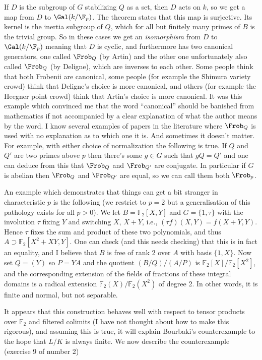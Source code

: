 If $D$ is the subgroup of $G$ stabilizing $Q$ as a set, then $D$ acts on $k$, so we get
a map from $D$ to $\Gal(k/\F_p)$. The theorem states that this map is surjective.
Its kernel is the inertia subgroup of $Q$, which for all but finitely many primes of $B$
is the trivial group. So in these cases we get an \emph{isomorphism} from $D$ to $\Gal(k/\F_p)$
meaning that $D$ is cyclic, and furthermore has two canonical generators, one called $\Frob_Q$
(by Artin) and the other one unfortunately also called $\Frob_Q$ (by Deligne), which are inverses
to each other. Some people think that both Frobenii are canonical, some people (for example
the Shimura variety crowd) think that Deligne's choice is more canonical, and others
(for example the Heegner point crowd) think that Artin's choice is more canonical.
It was this example which convinced me that the word ``canonical'' should be banished
from mathematics if not accompanied by a clear explanation of what the author means
by the word. I know several examples of papers in the literature where $\Frob_Q$ is
used with no explanation as to which one it is. And sometimes it doesn't matter.
For example, with either choice of normalization the following is true.
If $Q$ and $Q'$ are two primes above $p$ then there's some $g\in G$ such that
$gQ=Q'$ and one can deduce from this that $\Frob_Q$ and $\Frob_{Q'}$ are conjugate. In particular
if $G$ is abelian then $\Frob_Q$ and $\Frob_{Q'}$ are equal, so we can call them both $\Frob_p$.

An example which demonstrates that things can get a bit stranger in characteristic $p$ is the
following (we restrict to $p=2$ but a generalisation of this pathology exists for all $p>0$).
We let $B=\mathbb{F}_2[X,Y]$ and $G=\{1,\tau\}$ with the involution $\tau$
fixing $Y$ and switching $X$, $X+Y$, i.e., $(\tau f)(X,Y)=f(X+Y, Y)$.
Hence $\tau$ fixes the sum and product of these two polynomials, and thus
$A\supset \mathbb{F}_2[X^2+XY,Y]$. One can check (and this needs checking) that this
is in fact an equality, and I believe that $B$ is free of
rank 2 over $A$ with basis $\{1,X\}$.
Now set $Q=(Y)$ so $P=YA$ and the quotient $(B/Q)/(A/P)$ is
$\mathbb{F}_2[X]/\mathbb{F}_2[X^2]$, and the corresponding extension
of the fields of fractions of these integral domains is a radical extension
$\mathbb{F}_2(X)/\mathbb{F}_2(X^2)$ of degree 2.
In other words, it is finite and normal, but not separable.

It appears that this construction behaves well with respect to tensor
products over $\mathbb{F}_2$ and filtered colimits (I have not thought about
how to make this rigorous), and assuming this is true, it will explain Bourbaki's
counterexample to the hope that $L/K$ is always finite. We now describe the counterexample
(exercise 9 of number 2)

